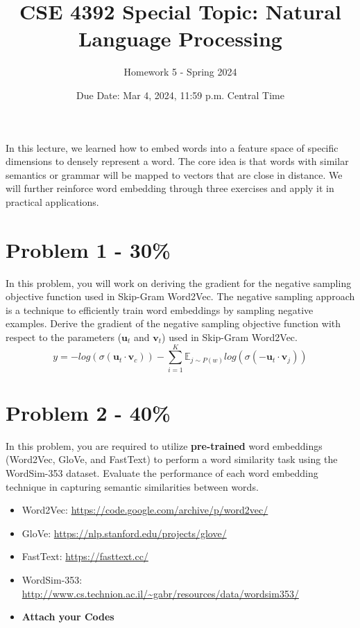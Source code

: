 \documentclass{article}
\begin{document}
\title{CSE 4392 Special Topic: Natural Language Processing}
\author{Homework 5 - Spring 2024}
\date{Due Date: Mar 4, 2024, 11:59 p.m. Central Time}
\maketitle
\thispagestyle{fancy}


In this lecture, we learned how to embed words into a feature space of specific dimensions to densely represent a word. The core idea is that words with similar semantics or grammar will be mapped to vectors that are close in distance. We will further reinforce word embedding through three exercises and apply it in practical applications.

\section*{Problem 1 - 30\%}
In this problem, you will work on deriving the gradient for the negative sampling objective function used in Skip-Gram Word2Vec. The negative sampling approach is a technique to efficiently train word embeddings by sampling negative examples.
Derive the gradient of the negative sampling objective function with respect to the parameters ($\mathbf{u}_t$ and $\mathbf{v}_t$) used in Skip-Gram Word2Vec.
$$y=-log(\sigma(\mathbf{u}_t \cdot \mathbf{v}_c)) - \sum_{i=1}^{K}\mathbb{E}_{j\sim P(w)}log(\sigma(-\mathbf{u}_t \cdot \mathbf{v}_j))$$

\section*{Problem 2 - 40\%}
In this problem, you are required to utilize \textbf{pre-trained} word embeddings (Word2Vec, GloVe, and FastText) to perform a word similarity task using the WordSim-353 dataset. Evaluate the performance of each word embedding technique in capturing semantic similarities between words.
\begin{itemize}
    \item Word2Vec: \url{https://code.google.com/archive/p/word2vec/}
    \item GloVe: \url{https://nlp.stanford.edu/projects/glove/}
    \item FastText: \url{https://fasttext.cc/}
    \item WordSim-353: \url{http://www.cs.technion.ac.il/~gabr/resources/data/wordsim353/} 
    \item \textbf{Attach your Codes}
\end{itemize}
\end{document}
